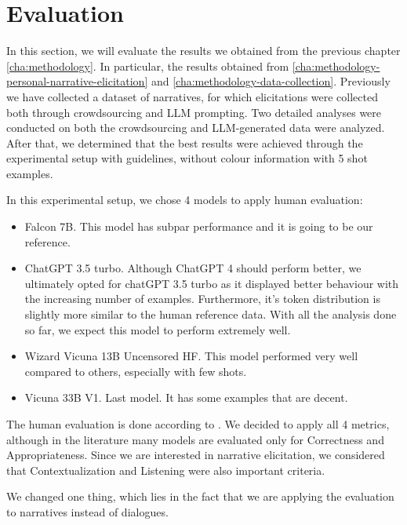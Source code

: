 \chapter{Evaluation}
\label{cha:evaluation}

In this section, we will evaluate the results we obtained from the previous chapter \ref{cha:methodology}. In particular, the results obtained from \ref{cha:methodology-personal-narrative-elicitation} and \ref{cha:methodology-data-collection}. 
Previously we have collected a dataset of narratives, for which elicitations were collected both through crowdsourcing and LLM prompting.
Two detailed analyses were conducted on both the crowdsourcing and LLM-generated data were analyzed. 
After that, we determined that the best results were achieved through the experimental setup with guidelines, without colour information with 5 shot examples. 


In this experimental setup, we chose 4 models to apply human evaluation:
\begin{itemize}
    \item Falcon 7B. This model has subpar performance and it is going to be our reference.
    \item ChatGPT 3.5 turbo. Although ChatGPT 4 should perform better, we ultimately opted for chatGPT 3.5 turbo as it displayed better behaviour with the increasing number of examples. Furthermore, it's token distribution is slightly more similar to the human reference data. With all the analysis done so far, we expect this model to perform extremely well.
    \item Wizard Vicuna 13B Uncensored HF. This model performed very well compared to others, especially with few shots.
    \item Vicuna 33B V1. Last model. It has some examples that are decent.
\end{itemize}

The human evaluation is done according to \cite{human}. We decided to apply all 4 metrics, although in the literature many models are evaluated only for Correctness and Appropriateness. Since we are interested in narrative elicitation, we considered that Contextualization and Listening were also important criteria. 

We changed one thing, which lies in the fact that we are applying the evaluation to narratives instead of dialogues.

